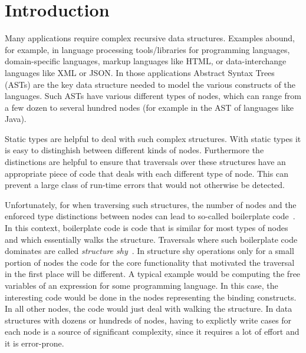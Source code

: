 \section{Introduction}

Many applications require complex recursive data structures. Examples
abound, for example, in language processing tools/libraries for programming
languages, domain-specific languages, markup languages like HTML, or
data-interchange languages like XML or JSON. In those applications
Abstract Syntax Trees (ASTs) are the key data structure needed to
model the various constructs of the languages. Such ASTs have various
different types of nodes, which can range from a few dozen to
several hundred nodes (for example in the AST of languages like Java).

Static types are helpful to deal with such complex structures.  With
static types it is easy to distinghish between different kinds of
nodes. Furthermore the distinctions are helpful to ensure that
traversals over these structures have an appropriate piece of code that
deals with each different type of node. This can prevent a large class
of run-time errors that would not otherwise be detected.


Unfortunately, for when traversing such structures, the number of nodes and the
enforced type distinctions between nodes can lead to so-called
boilerplate code~\cite{ralf03syb}. In this context, boilerplate code
is code that is similar for most types of nodes and which
essentially walks the structure. Traversals where such boilerplate
code dominates are called \emph{structure shy}~\cite{DemeterBook}. In
structure shy operations only for a small portion of nodes the code
for the core functionality that motivated the traversal in the first
place will be different. A typical example would be computing the free
variables of an expression for some programming language. In this
case, the interesting code would be done in the nodes representing the
binding constructs. In all other nodes, the code would just deal with
walking the structure. In data structures with dozens or hundreds of
nodes, having to explictly write cases for each node is a source of
significant complexity, since it requires a lot of effort and it is
error-prone.

